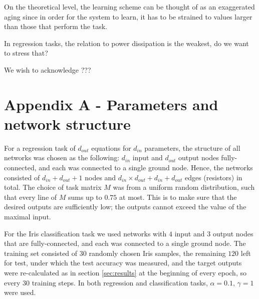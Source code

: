 \documentclass[%
 reprint,
 amsmath,amssymb,
 aps,
]{revtex4-2}
\begin{document}
    On the theoretical level, the learning scheme can be thought of as an exaggerated aging since in order for the system to learn, it has to be strained to values larger than those that perform the task.

    \textcolor{roie}{In regression tasks, the relation to power dissipation is the weakest, do we want to stress that?}


\begin{acknowledgments}
\textcolor{roie}{We wish to acknowledge ???}
\end{acknowledgments}

\appendix

\section{Appendix A - Parameters and network structure}\label{app:net_structure}

For a regression task of $d_{out}$ equations for $d_{in}$ parameters, the structure of all networks was chosen as the following: $d_{in}$ input and $d_{out}$ output nodes fully-connected, and each was connected to a single ground node. Hence, the networks consisted of $d_{in}+d_{out}+1$ nodes and $d_{in}\times d_{out}+d_{in}+d_{out}$ edges (resistors) in total. The choice of task matrix $M$ was from a uniform random distribution, such that every line of $M$ sums up to $0.75$ at most. This is to make sure that the desired outputs are sufficiently low; the outputs cannot exceed the value of the maximal input. 

For the Iris classification task we used networks with $4$ input and $3$ output nodes that are fully-connected, and each was connected to a single ground node. The training set consisted of $30$ randomly chosen Iris samples, the remaining $120$ left for test, under which the test accuracy was measured, and the target outputs were re-calculated as in section \ref{sec:results} at the beginning of every epoch, so every $30$ training steps. In both regression and classification tasks, $\alpha=0.1,\,\gamma=1$ were used.

\nocite{*}

\end{document}
